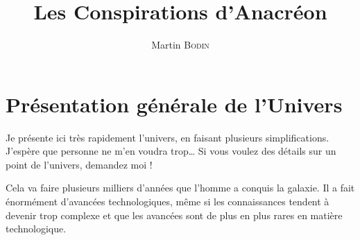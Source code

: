 \documentclass{article}
\title{Les Conspirations d’Anacréon}
\author{Martin \textsc{Bodin}}
\date{}
\begin{document}
\maketitle

\tableofcontents

\newpage

\newlength{\annee}
\settowidth{\annee}{Années 10 000}
\newlength{\texte}
\setlength{\texte}{\textwidth} \addtolength{\texte}{-\annee} 
	\addtolength{\texte}{-2\tabcolsep}

\section{Présentation générale de l’Univers}

Je présente ici très rapidement l’univers, en faisant plusieurs simplifications.
J’espère que personne ne m’en voudra trop…
Si vous voulez des détails sur un point de l’univers, demandez moi !

Cela va faire plusieurs milliers d’années que l’homme a conquis la galaxie.
Il a fait énormément d’avancées technologiques, même si les connaissances tendent à devenir trop complexe et que les avancées sont de plus en plus rares en matière technologique.
\end{document}
